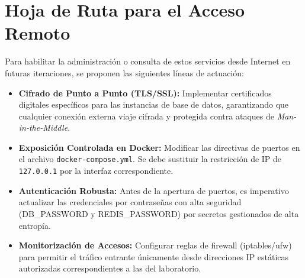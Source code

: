 \documentclass[12pt,a4paper]{report}
\begin{document}
\section{Hoja de Ruta para el Acceso Remoto}

Para habilitar la administración o consulta de estos servicios desde Internet en futuras iteraciones, se proponen las siguientes líneas de actuación:

\begin{itemize}
    \item \textbf{Cifrado de Punto a Punto (TLS/SSL):} Implementar certificados digitales específicos para las instancias de base de datos, garantizando que cualquier conexión externa viaje cifrada y protegida contra ataques de \textit{Man-in-the-Middle}.
    \item \textbf{Exposición Controlada en Docker:} Modificar las directivas de puertos en el archivo \texttt{docker-compose.yml}. Se debe sustituir la restricción de IP de \texttt{127.0.0.1} por la interfaz correspondiente.
    \item \textbf{Autenticación Robusta:} Antes de la apertura de puertos, es imperativo actualizar las credenciales por contraseñas con alta seguridad (DB\_PASSWORD y REDIS\_PASSWORD) por secretos gestionados de alta entropía.
    \item \textbf{Monitorización de Accesos:} Configurar reglas de firewall (iptables/ufw) para permitir el tráfico entrante únicamente desde direcciones IP estáticas autorizadas correspondientes a las del laboratorio.
\end{itemize}

\end{document}
